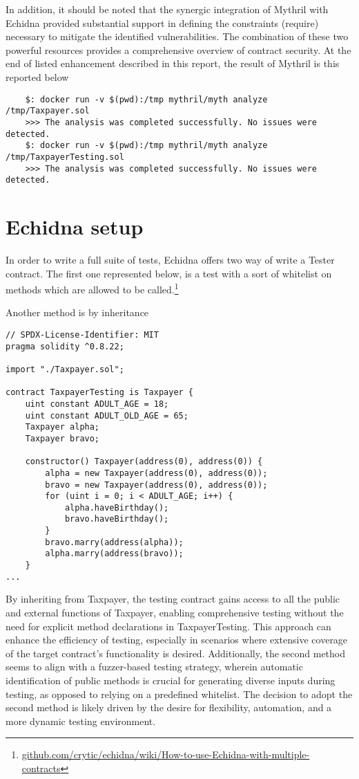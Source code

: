 \documentclass{article}
\begin{document}
In addition, it should be noted that the synergic integration of Mythril with Echidna provided substantial support in defining the constraints (require) necessary to mitigate the identified vulnerabilities. The combination of these two powerful resources provides a comprehensive overview of contract security.
At the end of listed enhancement described in this report, the result of Mythril is this reported below
\begin{verbatim}
    $: docker run -v $(pwd):/tmp mythril/myth analyze /tmp/Taxpayer.sol
    >>> The analysis was completed successfully. No issues were detected.
    $: docker run -v $(pwd):/tmp mythril/myth analyze /tmp/TaxpayerTesting.sol
    >>> The analysis was completed successfully. No issues were detected.
\end{verbatim}

\section{Echidna setup}
In order to write a full suite of tests, Echidna offers two way of write a Tester contract. The first one represented below, is a test with a sort of whitelist on methods which are allowed to be called.\footnote{\href{https://github.com/crytic/echidna/wiki/How-to-use-Echidna-with-multiple-contracts}{github.com/crytic/echidna/wiki/How-to-use-Echidna-with-multiple-contracts}}

Another method is by inheritance
\begin{verbatim}
// SPDX-License-Identifier: MIT
pragma solidity ^0.8.22;

import "./Taxpayer.sol"; 

contract TaxpayerTesting is Taxpayer {
    uint constant ADULT_AGE = 18;
    uint constant ADULT_OLD_AGE = 65;
    Taxpayer alpha;
    Taxpayer bravo;

    constructor() Taxpayer(address(0), address(0)) {
        alpha = new Taxpayer(address(0), address(0));
        bravo = new Taxpayer(address(0), address(0));
        for (uint i = 0; i < ADULT_AGE; i++) {
            alpha.haveBirthday();
            bravo.haveBirthday();
        }
        bravo.marry(address(alpha));
        alpha.marry(address(bravo));
    }
...
\end{verbatim}
By inheriting from Taxpayer, the testing contract gains access to all the public and external functions of Taxpayer, enabling comprehensive testing without the need for explicit method declarations in TaxpayerTesting. This approach can enhance the efficiency of testing, especially in scenarios where extensive coverage of the target contract's functionality is desired. Additionally, the second method seems to align with a fuzzer-based testing strategy, wherein automatic identification of public methods is crucial for generating diverse inputs during testing, as opposed to relying on a predefined whitelist. The decision to adopt the second method is likely driven by the desire for flexibility, automation, and a more dynamic testing environment.
\end{document}
